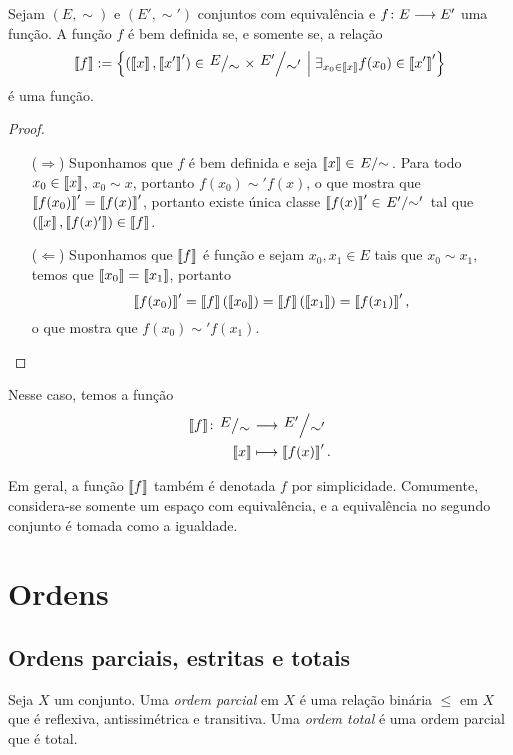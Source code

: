 \begin{proposition}
	Sejam $(E,\sim)$ e $(E',\sim')$ conjuntos com equivalência e ${f}\colon {E} \longrightarrow {E'}$ uma função. A função $f$ é bem definida se, e somente se, a relação
		\begin{equation*}
			\cla{f} := \set{(\cla{x},\cla{x'}') \in \quo{E}{\sim} \times \quo{E'}{\sim'}}{\exists_{x_0 \in \cla{x}} f(x_0) \in \cla{x'}'}
		\end{equation*}
	é uma função.
\end{proposition}
\begin{proof}
	\begin{enumerate}
		\item [($\Rightarrow$)] Suponhamos que $f$ é bem definida e seja $\cla{x} \in \quo{E}{\sim}$. Para todo $x_0 \in \left\llbracket{x}\right\rrbracket$, $x_0 \sim x$, portanto $f(x_0) \sim' f(x)$, o que mostra que $\left\llbracket{f(x_0)}\right\rrbracket' = \left\llbracket{f(x)}\right\rrbracket'$, portanto existe única classe $\cla{f(x)}' \in \quo{E'}{\sim'}$ tal que $(\left\llbracket{x}\right\rrbracket,\left\llbracket{f(x)'}\right\rrbracket) \in \left\llbracket{f}\right\rrbracket$.
		
		\item [($\Leftarrow$)] Suponhamos que $\left\llbracket{f}\right\rrbracket$ é função e sejam $x_0,x_1 \in E$ tais que $x_0 \sim x_1$, temos que $\left\llbracket{x_0}\right\rrbracket = \left\llbracket{x_1}\right\rrbracket$, portanto
			\begin{equation*}
				\left\llbracket{f(x_0)}\right\rrbracket' = \left\llbracket{f}\right\rrbracket(\left\llbracket{x_0}\right\rrbracket) = \left\llbracket{f}\right\rrbracket(\left\llbracket{x_1}\right\rrbracket) = \left\llbracket{f(x_1)}\right\rrbracket',
			\end{equation*}
		o que mostra que $f(x_0) \sim' f(x_1)$.
	\end{enumerate}
\end{proof}

Nesse caso, temos a função
	\begin{align*}
		\func{\cla{f}}{\quo{E}{\sim}}{\quo{E'}{\sim'}}{\cla{x}}{\cla{f(x)}'}.
	\end{align*}

Em geral, a função $\left\llbracket{f}\right\rrbracket$ também é denotada $f$ por simplicidade. Comumente, considera-se somente um espaço com equivalência, e a equivalência no segundo conjunto é tomada como a igualdade.

\section{Ordens}

\subsection{Ordens parciais, estritas e totais}

\begin{definition}
	Seja $X$ um conjunto. Uma \emph{ordem parcial} em $X$ é uma relação binária $\leq$ em $X$ que é reflexiva, antissimétrica e transitiva. Uma \emph{ordem total} é uma ordem parcial que é total.
\end{definition}

